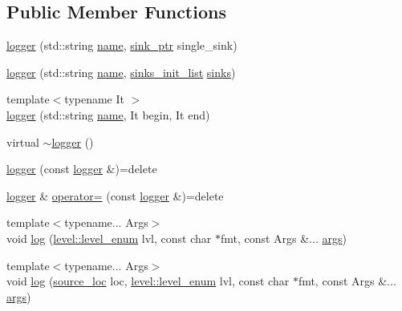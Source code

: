 \subsection*{Public Member Functions}
\begin{DoxyCompactItemize}
\item 
\hyperlink{classspdlog_1_1logger_a5d3b321a0319e9b8b27bf04f206a9900}{logger} (std\+::string \hyperlink{classspdlog_1_1logger_ac7c6ed0f30ace90402254dc2d3ef1453}{name}, \hyperlink{namespacespdlog_a422c57d3088160b517e5a74e5f318253}{sink\+\_\+ptr} single\+\_\+sink)
\item 
\hyperlink{classspdlog_1_1logger_af1f2f69f6bbbe9eb23cf428d66d20f70}{logger} (std\+::string \hyperlink{classspdlog_1_1logger_ac7c6ed0f30ace90402254dc2d3ef1453}{name}, \hyperlink{namespacespdlog_aa9b5c2298bf713fbe02b7e538d797ecd}{sinks\+\_\+init\+\_\+list} \hyperlink{classspdlog_1_1logger_a00c27f251b795caf028718b605572e1f}{sinks})
\item 
{\footnotesize template$<$typename It $>$ }\\\hyperlink{classspdlog_1_1logger_a414da79baaad89ba6ffe0e738027d234}{logger} (std\+::string \hyperlink{classspdlog_1_1logger_ac7c6ed0f30ace90402254dc2d3ef1453}{name}, It begin, It end)
\item 
virtual \hyperlink{classspdlog_1_1logger_a3691352a0a61bcba0bf3fb32d236bce5}{$\sim$logger} ()
\item 
\hyperlink{classspdlog_1_1logger_aa6074d763b0df4e7d16ccf7d307a3938}{logger} (const \hyperlink{classspdlog_1_1logger}{logger} \&)=delete
\item 
\hyperlink{classspdlog_1_1logger}{logger} \& \hyperlink{classspdlog_1_1logger_afd373cd857f49de170d9a23f1dd34bc0}{operator=} (const \hyperlink{classspdlog_1_1logger}{logger} \&)=delete
\item 
{\footnotesize template$<$typename... Args$>$ }\\void \hyperlink{classspdlog_1_1logger_a1e4b2c515490efb5456665a9a64382d9}{log} (\hyperlink{namespacespdlog_1_1level_a35f5227e5daf228d28a207b7b2aefc8b}{level\+::level\+\_\+enum} lvl, const char $\ast$fmt, const Args \&... \hyperlink{printf_8h_a47047b7b28fd1342eef756b79c778580}{args})
\item 
{\footnotesize template$<$typename... Args$>$ }\\void \hyperlink{classspdlog_1_1logger_a50417cea5f81704cd4800aaafa944bc5}{log} (\hyperlink{structspdlog_1_1source__loc}{source\+\_\+loc} loc, \hyperlink{namespacespdlog_1_1level_a35f5227e5daf228d28a207b7b2aefc8b}{level\+::level\+\_\+enum} lvl, const char $\ast$fmt, const Args \&... \hyperlink{printf_8h_a47047b7b28fd1342eef756b79c778580}{args})

\end{DoxyCompactItemize}
